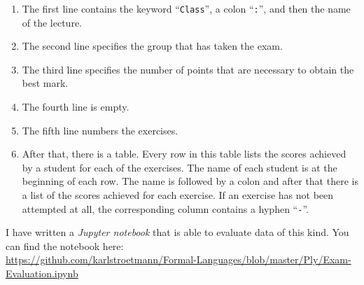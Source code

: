 
\begin{enumerate}
\item The first line contains the keyword ``\texttt{Class}'', a colon ``\texttt{:}'', and then the
      name of the lecture. 
\item The second line specifies the group that has taken the exam.
\item The third line specifies the number of points that are necessary to obtain the best mark.
\item The fourth line is empty.
\item The fifth line numbers the exercises.
\item After that, there is a table.  Every row in this table lists the scores achieved by a student
      for each of the exercises.  The name of each student is at the beginning of each row.  The
      name is followed by a colon and after that there is a list of the scores achieved for each
      exercise.  If an exercise has not been attempted at all, the corresponding column contains a hyphen
      ``\texttt{-}''.
\end{enumerate}
I have written a \textsl{Jupyter notebook} that is able to evaluate data of this kind.
You can find the notebook here:
\\[0.2cm]
\hspace*{1.3cm}
\href{https://github.com/karlstroetmann/Formal-Languages/blob/master/Ply/Exam-Evaluation.ipynb}{https://github.com/karlstroetmann/Formal-Languages/blob/master/Ply/Exam-Evaluation.ipynb}

